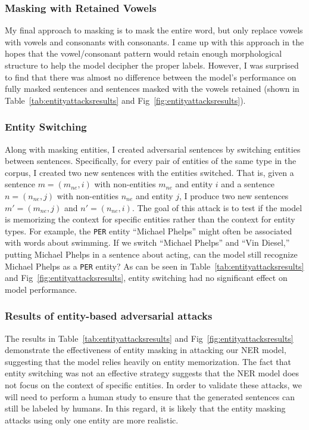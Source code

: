  \subsubsection{Masking with Retained Vowels}
 My final approach to masking is to mask the entire word, but only replace vowels with vowels and consonants with consonants. I came up with this approach in the hopes that the vowel/consonant pattern would retain enough morphological structure to help the model decipher the proper labels. However, I was surprised to find that there was almost no difference between the model's performance on fully masked sentences and sentences masked with the vowels retained (shown in Table~\ref{tab:entityattacksresults} and Fig~\ref{fig:entityattacksresults}).
 
 \subsubsection{Entity Switching}
 Along with masking entities, I created adversarial sentences by switching entities between sentences. Specifically, for every pair of entities of the same type in the corpus, I created two new sentences with the entities switched. That is, given a sentence $m = (m_{ne}, i)$ with non-entities $m_{ne}$ and entity $i$ and a sentence $n = (n_{ne}, j)$ with non-entities $n_{ne}$ and entity $j$, I produce two new sentences $m' = (m_{ne}, j)$ and $n' = (n_{ne}, i)$. The goal of this attack is to test if the model is memorizing the context for specific entities rather than the context for entity types. For example, the \texttt{PER} entity ``Michael Phelps'' might often be associated with words about swimming. If we switch ``Michael Phelps'' and ``Vin Diesel,'' putting Michael Phelps in a sentence about acting, can the model still recognize Michael Phelps as a \texttt{PER} entity? As can be seen in Table~\ref{tab:entityattacksresults} and Fig~\ref{fig:entityattacksresults}, entity switching had no significant effect on model performance.
 
 \subsubsection{Results of entity-based adversarial attacks}
  The results in Table~\ref{tab:entityattacksresults} and Fig~\ref{fig:entityattacksresults} demonstrate the effectiveness of entity masking in attacking our NER model, suggesting that the model relies heavily on entity memorization. The fact that entity switching was not an effective strategy suggests that the NER model does not focus on the context of specific entities. In order to validate these attacks, we will need to perform a human study to ensure that the generated sentences can still be labeled by humans. In this regard, it is likely that the entity masking attacks using only one entity are more realistic.
  
